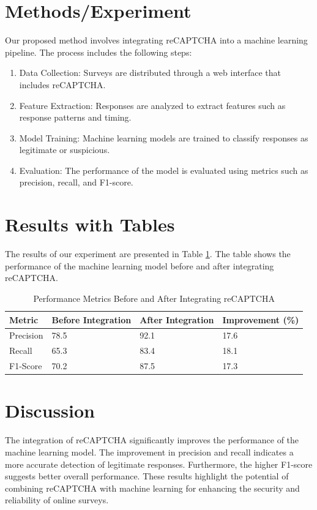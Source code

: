 \documentclass{article}
\begin{document}
\section{Methods/Experiment}
Our proposed method involves integrating reCAPTCHA into a machine learning pipeline. The process includes the following steps:
\begin{enumerate}
    \item Data Collection: Surveys are distributed through a web interface that includes reCAPTCHA.
    \item Feature Extraction: Responses are analyzed to extract features such as response patterns and timing.
    \item Model Training: Machine learning models are trained to classify responses as legitimate or suspicious.
    \item Evaluation: The performance of the model is evaluated using metrics such as precision, recall, and F1-score.
\end{enumerate}

\section{Results with Tables}
The results of our experiment are presented in Table \ref{tab:results}. The table shows the performance of the machine learning model before and after integrating reCAPTCHA.

\begin{table}[ht]
\centering
\caption{Performance Metrics Before and After Integrating reCAPTCHA}
\label{tab:results}
\begin{tabular}{@{}llll@{}}
\toprule
Metric & Before Integration & After Integration & Improvement (\%) \\
\midrule
Precision & 78.5 & 92.1 & 17.6 \\
Recall   & 65.3 & 83.4 & 18.1 \\
F1-Score & 70.2 & 87.5 & 17.3 \\
\bottomrule
\end{tabular}
\end{table}

\section{Discussion}
The integration of reCAPTCHA significantly improves the performance of the machine learning model. The improvement in precision and recall indicates a more accurate detection of legitimate responses. Furthermore, the higher F1-score suggests better overall performance. These results highlight the potential of combining reCAPTCHA with machine learning for enhancing the security and reliability of online surveys.
\end{document}
